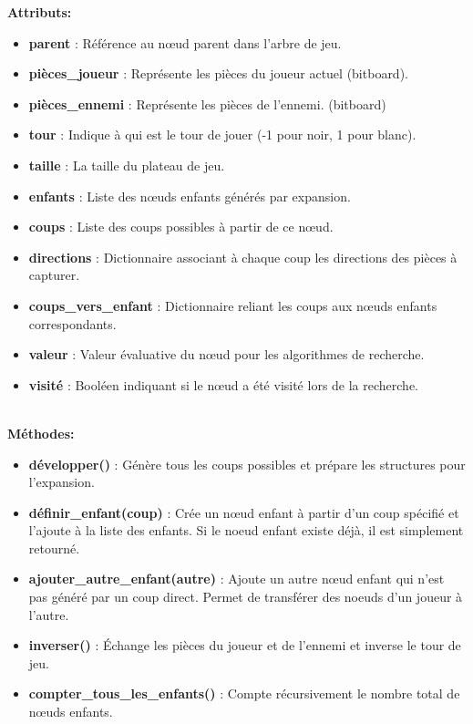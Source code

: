 \noindent\textbf{Attributs:}
\begin{itemize}
    \item \textbf{parent} : Référence au nœud parent dans l'arbre de jeu.
    \item \textbf{pièces\_joueur} : Représente les pièces du joueur actuel (bitboard).
    \item \textbf{pièces\_ennemi} : Représente les pièces de l'ennemi. (bitboard)
    \item \textbf{tour} : Indique à qui est le tour de jouer (-1 pour noir, 1 pour blanc).
    \item \textbf{taille} : La taille du plateau de jeu.
    \item \textbf{enfants} : Liste des nœuds enfants générés par expansion.
    \item \textbf{coups} : Liste des coups possibles à partir de ce nœud.
    \item \textbf{directions} : Dictionnaire associant à chaque coup les directions des pièces à capturer.
    \item \textbf{coups\_vers\_enfant} : Dictionnaire reliant les coups aux nœuds enfants correspondants.
    \item \textbf{valeur} : Valeur évaluative du nœud pour les algorithmes de recherche.
    \item \textbf{visité} : Booléen indiquant si le nœud a été visité lors de la recherche.
\end{itemize}
\leavevmode\\
\textbf{Méthodes:}
\begin{itemize}
    \item \textbf{développer()} : Génère tous les coups possibles et prépare les structures pour l'expansion.
    \item \textbf{définir\_enfant(coup)} : Crée un nœud enfant à partir d'un coup spécifié et l'ajoute à la liste des enfants. Si le noeud enfant existe déjà, il est simplement retourné.
    \item \textbf{ajouter\_autre\_enfant(autre)} : Ajoute un autre nœud enfant qui n'est pas généré par un coup direct. Permet de transférer des noeuds d'un joueur à l'autre.
    \item \textbf{inverser()} : Échange les pièces du joueur et de l'ennemi et inverse le tour de jeu.
    \item \textbf{compter\_tous\_les\_enfants()} : Compte récursivement le nombre total de nœuds enfants.
\end{itemize}


